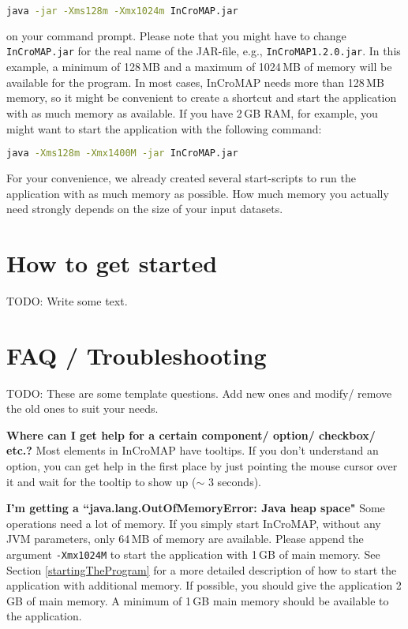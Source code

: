 \begin{lstlisting}[language=bash,numbers=none]
java -jar -Xms128m -Xmx1024m InCroMAP.jar
\end{lstlisting}

\noindent on your command prompt. Please note that you might have to change \texttt{InCroMAP.jar} for the real name of the JAR-file, e.g., \texttt{InCroMAP1.2.0.jar}. In this example, a minimum of 128\,MB and a maximum of 1024\,MB of memory will be available for the program. In most cases, InCroMAP needs more than 128\,MB memory, so it might be convenient to create a shortcut and start the application with as much memory as available. If you have 2\,GB RAM, for example, you might want to start the application with the following command:

\begin{lstlisting}[language=bash,numbers=none]
java -Xms128m -Xmx1400M -jar InCroMAP.jar
\end{lstlisting}

For your convenience, we already created several start-scripts to run the application with as much memory as possible. How much memory you actually need strongly depends on the size of your input datasets.
%

\chapter{How to get started}

TODO: Write some text.


\chapter{FAQ / Troubleshooting}
\label{ch:faq}

TODO: These are some template questions. Add new ones and modify/ remove the old ones to suit your needs.

\noindent \textbf{Where can I get help for a certain component/ option/ checkbox/ etc.?}\newline
Most elements in InCroMAP have tooltips. If you don't understand an option, you can get help in the first place by just pointing the mouse cursor over it and wait for the tooltip to show up ($\sim$ 3 seconds).\newline

\noindent \textbf{I'm getting a ``java.lang.OutOfMemoryError: Java heap space"}\newline
Some operations need a lot of memory. If you simply start InCroMAP, without any JVM parameters, only 64\,MB of memory are available. Please append the argument \texttt{-Xmx1024M} to start the application with 1\,GB of main memory. See Section \ref{startingTheProgram} for a more detailed description of how to start the application with additional memory. If possible, you should give the application 2\,GB of main memory. A minimum of 1\,GB main memory should be available to the application.\newline

